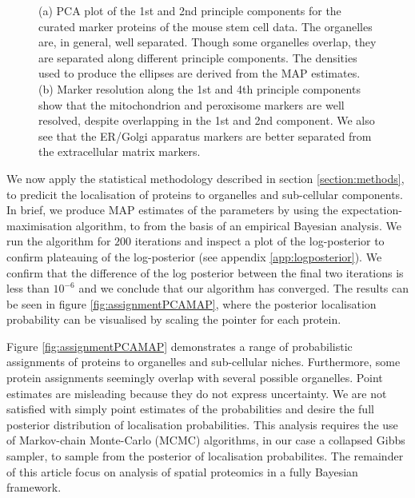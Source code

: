 \documentclass[12pt,english]{article}
\begin{document}
\begin{figure}[ht]
\begin{subfigure}[t]{0.5\textwidth}
        \caption{}
\end{subfigure}
  \centering
  \caption{ (a) PCA plot of the 1st and 2nd principle components for
    the curated marker proteins of the mouse stem cell data. The organelles
    are, in general, well separated. Though some organelles
    overlap, they are separated along different principle
    components. The densities used to produce the ellipses
    are derived from the MAP estimates. (b) Marker
    resolution along the 1st and 4th principle
    components show that the mitochondrion and peroxisome
    markers are well resolved, despite overlapping in the 1st and 2nd component.
    We also see that the ER/Golgi
        apparatus markers are better separated from the
    extracellular matrix markers.}
\label{figure::pcaellipse}
\end{figure}


\clearpage



We now apply the statistical methodology described in section \ref{section:methods},
to predicit the localisation of proteins to organelles and sub-cellular components.
In brief, we produce MAP estimates of the parameters by using the expectation-maximisation
algorithm, to from the basis of an empirical Bayesian analysis.
We run the algorithm for $200$ iterations and inspect a plot of the
log-posterior to confirm plateauing of the log-posterior (see appendix \ref{app:logposterior}). We confirm
that the difference of the log posterior between the final two iterations is less than $10^{-6}$
and we conclude that our algorithm has converged. The results can be seen in figure
\ref{fig:assignmentPCAMAP}, where the posterior localisation probability can be visualised by scaling the pointer
for each protein.

Figure \ref{fig:assignmentPCAMAP} demonstrates a range of probabilistic
assignments of proteins to organelles and sub-cellular niches. Furthermore, some protein assignments
seemingly overlap with several possible organelles. Point estimates are
misleading because they do not express uncertainty. We
are not satisfied with simply point estimates of the
probabilities and desire the full posterior distribution of localisation probabilities.
This analysis requires the use of Markov-chain Monte-Carlo (MCMC) algorithms, in our case a collapsed
Gibbs sampler, to sample from the posterior of localisation probabilites. The remainder of this
article focus on analysis of spatial proteomics in a fully Bayesian framework.
\end{document}
